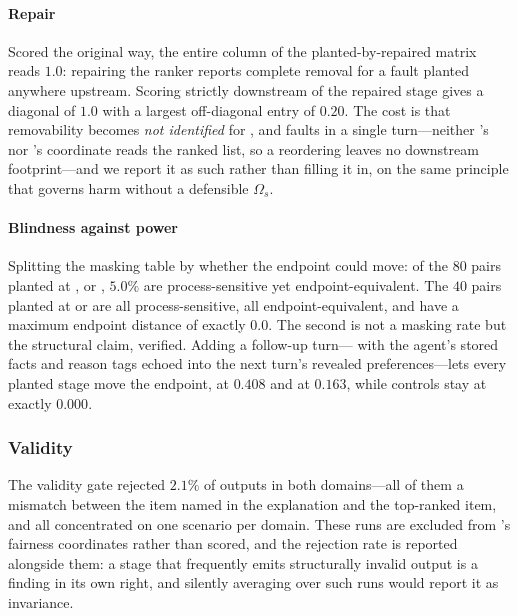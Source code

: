 \paragraph{Repair}
Scored the original way, the entire  column of the planted-by-repaired matrix reads
$1.0$: repairing the ranker reports complete removal for a fault planted anywhere upstream.
Scoring strictly downstream of the repaired stage gives a diagonal of $1.0$ with a largest
off-diagonal entry of $0.20$. The cost is that removability becomes \emph{not identified} for
,  and  faults in a single turn---neither 's
nor 's coordinate reads the ranked list, so a reordering leaves no downstream
footprint---and we report it as such rather than filling it in, on the same principle that governs
harm without a defensible $\Omega_s$.

\paragraph{Blindness against power}
Splitting the masking table by whether the endpoint could move: of the $80$ pairs planted at
,  or , $5.0\%$ are process-sensitive yet
endpoint-equivalent. The $40$ pairs planted at  or  are all
process-sensitive, all endpoint-equivalent, and have a maximum endpoint distance of exactly $0.0$.
The second is not a masking rate but the structural claim, verified. Adding a follow-up turn---
with the agent's stored facts and reason tags echoed into the next turn's revealed
preferences---lets every planted stage move the endpoint,  at $0.408$ and
 at $0.163$, while controls stay at exactly $0.000$.

\subsubsection{Validity}
\label{sec:scaff-validity}

The validity gate rejected $2.1\%$ of  outputs in both domains---all of them a
mismatch between the item named in the explanation and the top-ranked item, and all concentrated
on one scenario per domain. These runs are excluded from 's fairness coordinates
rather than scored, and the rejection rate is reported alongside them: a stage that frequently
emits structurally invalid output is a finding in its own right, and silently averaging over such
runs would report it as invariance.
